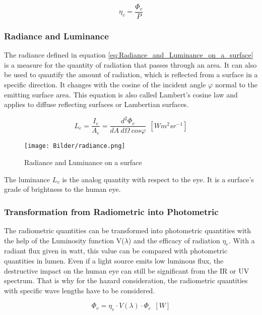 \begin{equation}
\eta_v = \frac {\Phi_v}{P}
\end{equation}
\medskip

\subsubsection{Radiance and Luminance}
The radiance defined in equation \ref{eq:Radiance_and_Luminance_on_a_surface} is a measure for the quantity of radiation that passes through an area. It can also be used to quantify the amount of radiation, which is reflected from a surface in a specific direction. It changes with the cosine of the incident angle $\varphi$ normal to the emitting surface area. This equation is also called Lambert's cosine law and applies to diffuse reflecting surfaces or Lambertian surfaces.

\begin{equation}
L_e = \frac{I_e}{A_e} = \frac{d^2\Phi_v}{dA~d\Omega~cos\varphi} ~~ [W m^2 sr^{-1}]
\label{eq:Radiance_and_Luminance_on_a_surface}
\end{equation}

\begin{figure}[!h]
	\centering
	\texttt{[image: Bilder/radiance.png]}
	\caption{Radiance and Luminance on a surface}
	\label{fig:Radiance_and_Luminance_on_a_surface}
\end{figure} 

The luminance $L_v$ is the analog quantity with respect to the eye. It is a surface's grade of brightness to the human eye.

\subsubsection{Transformation from Radiometric into Photometric}

The radiometric quantities can be transformed into photometric quantities with the help of the Luminosity function V($\lambda$) and the efficacy of radiation $\eta_e$. With a radiant flux given in watt, this value can be compared with photometric quantities in lumen. Even if a light source emits low luminous flux, the destructive impact on the human eye can still be significant from the IR or UV spectrum. That is why for the hazard consideration, the radiometric quantities with specific wave lengths have to be considered. 

\begin{equation}
\Phi_v =\eta_e \cdot V(\lambda) \cdot \Phi_e ~~ [W] 
\end{equation}

